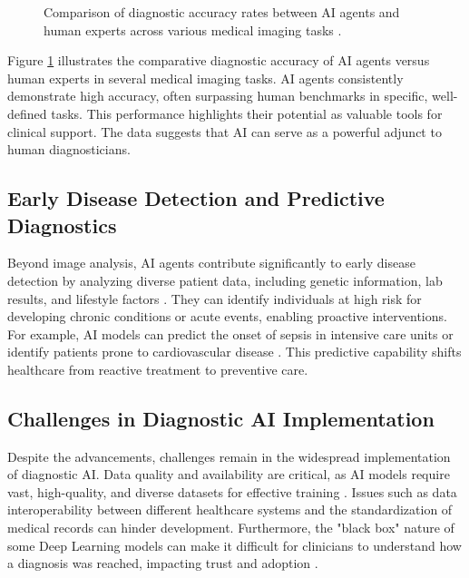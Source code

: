 \documentclass[12pt,a4paper]{article}
\begin{document}
\begin{figure}[H]
  \centering
  \caption{Comparison of diagnostic accuracy rates between AI agents and human experts across various medical imaging tasks \cite{rajpurkar2017chexnet, campanella2019deep}.}
  \label{fig:accuracy}
\end{figure}

Figure \ref{fig:accuracy} illustrates the comparative diagnostic accuracy of AI agents versus human experts in several medical imaging tasks. AI agents consistently demonstrate high accuracy, often surpassing human benchmarks in specific, well-defined tasks. This performance highlights their potential as valuable tools for clinical support. The data suggests that AI can serve as a powerful adjunct to human diagnosticians.

\subsection{Early Disease Detection and Predictive Diagnostics}
Beyond image analysis, AI agents contribute significantly to early disease detection by analyzing diverse patient data, including genetic information, lab results, and lifestyle factors \cite{topol2019deep}. They can identify individuals at high risk for developing chronic conditions or acute events, enabling proactive interventions. For example, AI models can predict the onset of sepsis in intensive care units or identify patients prone to cardiovascular disease \cite{shah2019artificial}. This predictive capability shifts healthcare from reactive treatment to preventive care.

\subsection{Challenges in Diagnostic AI Implementation}
Despite the advancements, challenges remain in the widespread implementation of diagnostic AI. Data quality and availability are critical, as AI models require vast, high-quality, and diverse datasets for effective training \cite{mckinney2020international}. Issues such as data interoperability between different healthcare systems and the standardization of medical records can hinder development. Furthermore, the "black box" nature of some Deep Learning models can make it difficult for clinicians to understand how a diagnosis was reached, impacting trust and adoption \cite{nih_ethical_implications}.
\end{document}
